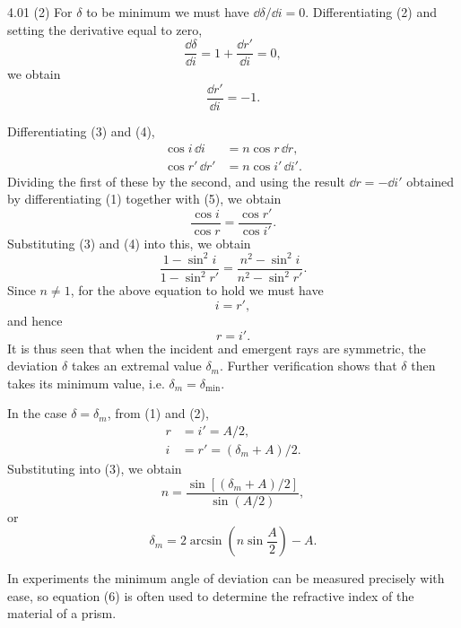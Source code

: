 \begin{solution}{4.01}
(2) For $\delta$ to be minimum we must have $\dd\delta/\dd i=0$. Differentiating (2) and setting the
derivative equal to zero,
\begin{equation*}
\frac{\dd\delta}{\dd i} = 1+\frac{\dd r'}{\dd i} = 0,
\end{equation*}
we obtain
\begin{equation}
\frac{\dd r'}{\dd i} = -1. \tag{5}
\end{equation}

Differentiating (3) and (4),
\begin{align*}
\cos i\,\dd i &= n\cos r\,\dd r,\\
\cos r'\,\dd r' &= n\cos i'\,\dd i'.
\end{align*}
Dividing the first of these by the second, and using the result $\dd r=-\dd i'$ obtained by
differentiating (1) together with (5), we obtain
\begin{equation*}
\frac{\cos i}{\cos r} = \frac{\cos r'}{\cos i'}.
\end{equation*}
Substituting (3) and (4) into this, we obtain
\begin{equation*}
\frac{1-\sin^2 i}{1-\sin^2 r'} = \frac{n^2-\sin^2 i}{n^2-\sin^2 r'}.
\end{equation*}
Since $n\neq 1$, for the above equation to hold we must have
\begin{equation*}
i = r',
\end{equation*}
and hence
\begin{equation*}
r = i'.
\end{equation*}
It is thus seen that when the incident and emergent rays are symmetric, the deviation $\delta$
takes an extremal value $\delta_m$. Further verification shows that $\delta$ then takes its
minimum value, i.e. $\delta_m=\delta_{\min}$.

In the case $\delta=\delta_m$, from (1) and (2),
\begin{align*}
r &= i' = A/2,\\
i &= r' = (\delta_m+A)/2.
\end{align*}
Substituting into (3), we obtain
\begin{equation}
n = \frac{\sin\left[(\delta_m+A)/2\right]}{\sin(A/2)}, \tag{6}
\end{equation}
or
\begin{equation*}
\delta_m = 2\arcsin\left(n\sin\frac{A}{2}\right)-A.
\end{equation*}

\begin{commentary}
In experiments the minimum angle of deviation can be measured precisely with ease, so equation
(6) is often used to determine the refractive index of the material of a prism.


\end{commentary}
\end{solution}
